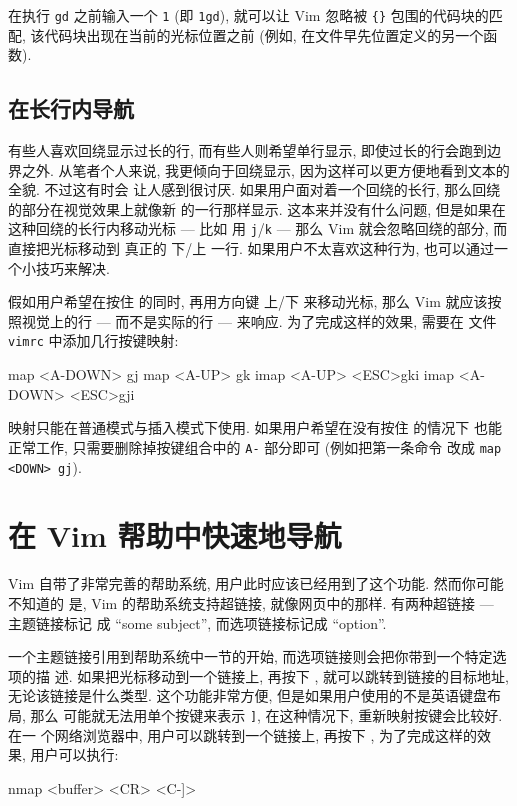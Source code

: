\begin{tips}
    在执行 \texttt{gd} 之前输入一个 \texttt{1} (即 \texttt{1gd}), 就可以让 Vim
    忽略被 \verb'{}' 包围的代码块的匹配, 该代码块出现在当前的光标位置之前
    (例如, 在文件早先位置定义的另一个函数).
\end{tips}

\subsection{在长行内导航}
\label{subsec:navigating_long_lines}

有些人喜欢回绕显示过长的行, 而有些人则希望单行显示, 即使过长的行会跑到边界之外.
从笔者个人来说, 我更倾向于回绕显示, 因为这样可以更方便地看到文本的全貌. 不过这有时会
让人感到很讨厌. 如果用户面对着一个回绕的长行, 那么回绕的部分在视觉效果上就像新
的一行那样显示. 这本来并没有什么问题, 但是如果在这种回绕的长行内移动光标 --- 比如
用 \texttt{j}/\texttt{k} --- 那么 Vim 就会忽略回绕的部分, 而直接把光标移动到
真正的 下/上 一行. 如果用户不太喜欢这种行为, 也可以通过一个小技巧来解决.

假如用户希望在按住  的同时, 再用方向键 上/下 来移动光标, 那么 Vim
就应该按照视觉上的行 --- 而不是实际的行 --- 来响应. 为了完成这样的效果, 需要在
文件 \texttt{vimrc} 中添加几行按键映射:
\begin{vimcode}
map <A-DOWN> gj
map <A-UP> gk
imap <A-UP> <ESC>gki
imap <A-DOWN> <ESC>gji
\end{vimcode}

映射只能在普通模式与插入模式下使用. 如果用户希望在没有按住  的情况下
也能正常工作, 只需要删除掉按键组合中的 \texttt{A-} 部分即可 (例如把第一条命令
改成 \texttt{map <DOWN> gj}).

\section{在 Vim 帮助中快速地导航}
\label{sec:faster_navigation_in_vim_help}

Vim 自带了非常完善的帮助系统, 用户此时应该已经用到了这个功能. 然而你可能不知道的
是, Vim 的帮助系统支持超链接, 就像网页中的那样. 有两种超链接 --- 主题链接标记
成 ``some subject'', 而选项链接标记成 ``option''.

一个主题链接引用到帮助系统中一节的开始, 而选项链接则会把你带到一个特定选项的描
述. 如果把光标移动到一个链接上, 再按下 \key{Ctrl+]}, 就可以跳转到链接的目标地址,
无论该链接是什么类型. 这个功能非常方便, 但是如果用户使用的不是英语键盘布局, 那么
可能就无法用单个按键来表示 \texttt{]}, 在这种情况下, 重新映射按键会比较好. 在一
个网络浏览器中, 用户可以跳转到一个链接上, 再按下 , 为了完成这样的效
果, 用户可以执行:
\begin{vimcode}
nmap <buffer> <CR> <C-]>
\end{vimcode}

